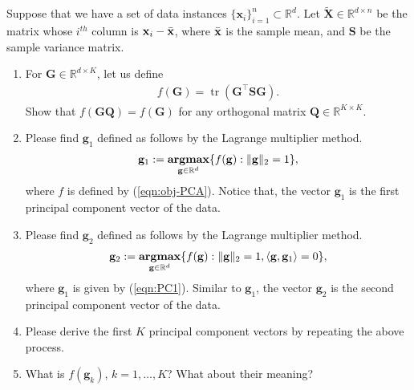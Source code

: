 \documentclass[11pt,letter,notitlepage]{article}
\DeclareMathOperator*{\argmax}{\bf argmax}
\begin{document}
\begin{exercise}
    Suppose that we have a set of data instances $\{\mathbf{x}_i\}_{i=1}^n\subset\mathbb{R}^d$. Let $\widetilde{\mathbf{X}}\in\mathbb{R}^{d\times n}$ be the matrix whose $i^{th}$ column is $\mathbf{x}_i-\Bar{\mathbf{x}}$, where $\Bar{\mathbf{x}}$ is the sample mean, and $\mathbf{S}$ be the sample variance matrix.

    \begin{enumerate}
        \item For $\mathbf{G}\in\mathbb{R}^{d\times K}$, let us define
        \begin{align}\label{eqn:obj-PCA}
            f(\mathbf{G}) = \operatorname{tr}(\mathbf{G}^{\top}\mathbf{SG}).
        \end{align}
        Show that $f(\mathbf{GQ})=f(\mathbf{G})$ for any orthogonal matrix $\mathbf{Q}\in\mathbb{R}^{K\times K}$.
        
        \item Please find $\mathbf{g}_1$ defined as follows by the Lagrange multiplier method.
            \begin{align}\label{eqn:PC1}
                \mathbf{g}_1:=\argmax_{\mathbf{g}\in\mathbb{R}^d}\{f(\mathbf{g}):\|\mathbf{g}\|_2=1\},
            \end{align}
            where $f$ is defined by (\ref{eqn:obj-PCA}). Notice that, the vector $\mathbf{g}_1$ is the first principal component vector of the data.
            
        \item Please find $\mathbf{g}_2$ defined as follows by the Lagrange multiplier method.
            \begin{align*}
                \mathbf{g}_2:=\argmax_{\mathbf{g}\in\mathbb{R}^d}\{f(\mathbf{g}):\|\mathbf{g}\|_2=1,\langle\mathbf{g},\mathbf{g}_1\rangle=0\},
            \end{align*}
            where $\mathbf{g}_1$ is given by (\ref{eqn:PC1}). Similar to $\mathbf{g}_1$, the vector $\mathbf{g}_2$ is the second principal component vector of the data.
            
        \item Please derive the first $K$ principal component vectors by repeating the above process.
        
        \item What is $f(\mathbf{g}_k)$, $k=1,\ldots,K$? What about their meaning?
        
    \end{enumerate}
\end{exercise}
\begin{solution}${}$

\end{solution}
\end{document}
